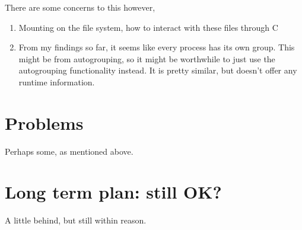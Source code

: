 \documentclass[12pt]{article}
\begin{document}
There are some concerns to this however, 
\begin{enumerate}
    \item Mounting on the file system, how to interact with these files through C
    \item From my findings so far, it seems like every process has its own group. This might be from autogrouping, so it might be worthwhile to just use the autogrouping functionality instead. It is pretty similar, but doesn't offer any runtime information.
\end{enumerate}
\section*{Problems}
Perhaps some, as mentioned above.
\section*{Long term plan: still OK?}
A little behind, but still within reason.



\end{document}
